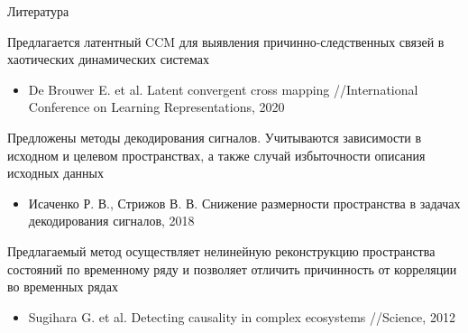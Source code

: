 \documentclass[9pt]{beamer}
\begin{document}
\begin{frame}{Литература}
\begin{block}
 {Предлагается латентный CCM для выявления причинно-следственных связей в хаотических динамических системах}
\begin{itemize}
		\item De Brouwer E. et al. Latent convergent cross mapping //International Conference on Learning Representations, 2020
	\end{itemize}
\end{block}
\begin{block}{Предложены методы декодирования сигналов. Учитываются зависимости в исходном и целевом пространствах, а также случай избыточности описания исходных данных}
 	\begin{itemize}
		\item Исаченко Р. В., Стрижов В. В. Снижение размерности пространства в задачах декодирования сигналов, 2018
	    
	\end{itemize}
\end{block}
\begin{block}{Предлагаемый метод осуществляет нелинейную реконструкцию пространства состояний по временному ряду и позволяет отличить причинность от корреляции во временных рядах}
\begin{itemize}
		\item Sugihara G. et al. Detecting causality in complex ecosystems //Science, 2012
	\end{itemize}
\end{block}
	
\end{frame}
\end{document}
